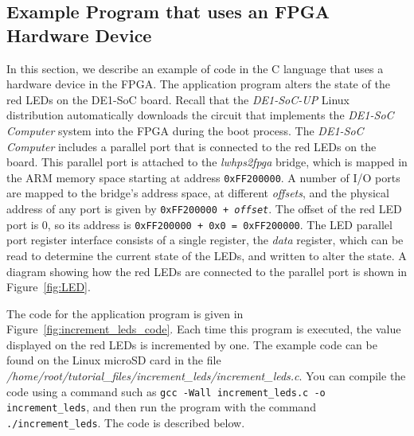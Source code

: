 \documentclass[11pt, twoside, pdftex]{article}
\begin{document}
\subsection{Example Program that uses an FPGA Hardware Device}
\label{sec:program_with_fpga_communication}

In this section, we describe an example of code in the C language that uses a hardware
device in the FPGA. The application program alters the state of the red LEDs on 
the DE1-SoC board. 
Recall that the \textit{DE1-SoC-UP} Linux distribution automatically downloads the
circuit that implements the \textit{DE1-SoC Computer} system into the FPGA 
during the boot process. The \textit{DE1-SoC Computer} 
includes a parallel port that is connected to the red LEDs on the board. This parallel port 
is attached to the \textit{lwhps2fpga} bridge, which is mapped in the ARM memory space starting 
at address \texttt{0xFF200000}. A number of I/O ports are mapped to the bridge's
address space, at different {\it offsets}, and the 
physical address of any port is given by \texttt{0xFF200000 + {\it offset}}. The offset
of the red LED port is 0, so its address is \texttt{0xFF200000 + 0x0 = 0xFF200000}.
The LED parallel port register interface consists of a single register, the \textit{data} 
register, which can be read to determine the current state of the LEDs, and written to 
alter the state. A diagram showing how the red LEDs are connected to the parallel port is shown 
in Figure~\ref{fig:LED}.

The code for the application program is given in Figure~\ref{fig:increment_leds_code}.
Each time this program is executed, the value displayed on the red LEDs
is incremented by one. The example code can be found on the Linux microSD card in the file
\textit{/home/root/tutorial\_files/increment\_leds/increment\_leds.c}. You can 
compile the code using a command such as \texttt{gcc -Wall increment\_leds.c -o
increment\_leds}, and then run the program with the command \texttt{./increment\_leds}.
The code is described below. 
\end{document}
